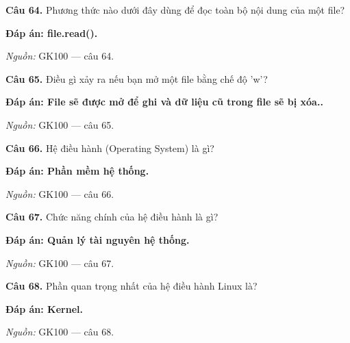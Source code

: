 \documentclass[11pt,a4paper]{article}
\begin{document}
\textbf{Câu 64.} Phương thức nào dưới đây dùng để đọc toàn bộ nội dung của một file?\par
{\color{answer}\textbf{Đáp án: file.read().}}\par
{\footnotesize\color{sourcegray}\textit{Nguồn:} GK100 — câu 64.\par}
\vspace{3pt}\par\noindent{\color{black!18}\rule{\linewidth}{0.3pt}}\par\medskip

\textbf{Câu 65.} Điều gì xảy ra nếu bạn mở một file bằng chế độ 'w'?\par
{\color{answer}\textbf{Đáp án: File sẽ được mở để ghi và dữ liệu cũ trong file sẽ bị xóa..}}\par
{\footnotesize\color{sourcegray}\textit{Nguồn:} GK100 — câu 65.\par}
\vspace{3pt}\par\noindent{\color{black!18}\rule{\linewidth}{0.3pt}}\par\medskip

\textbf{Câu 66.} Hệ điều hành (Operating System) là gì?\par
{\color{answer}\textbf{Đáp án: Phần mềm hệ thống.}}\par
{\footnotesize\color{sourcegray}\textit{Nguồn:} GK100 — câu 66.\par}
\vspace{3pt}\par\noindent{\color{black!18}\rule{\linewidth}{0.3pt}}\par\medskip

\textbf{Câu 67.} Chức năng chính của hệ điều hành là gì?\par
{\color{answer}\textbf{Đáp án: Quản lý tài nguyên hệ thống.}}\par
{\footnotesize\color{sourcegray}\textit{Nguồn:} GK100 — câu 67.\par}
\vspace{3pt}\par\noindent{\color{black!18}\rule{\linewidth}{0.3pt}}\par\medskip

\textbf{Câu 68.} Phần quan trọng nhất của hệ điều hành Linux là?\par
{\color{answer}\textbf{Đáp án: Kernel.}}\par
{\footnotesize\color{sourcegray}\textit{Nguồn:} GK100 — câu 68.\par}
\vspace{3pt}\par\noindent{\color{black!18}\rule{\linewidth}{0.3pt}}\par\medskip
\end{document}
